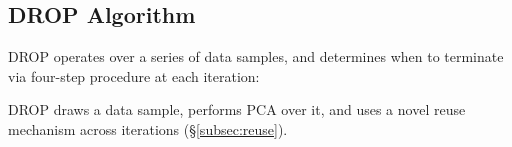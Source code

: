 \subsection{DROP Algorithm}
\label{subsec:arch}
DROP operates over a series of data samples, and determines when to terminate via  four-step procedure at each iteration: %



\begin{comment}
\item Progressive Sampling (\S\ref{subsec:psample}): DROP draws a data sample, performs PCA over it, and uses of a novel reuse mechanism across iterations (\S\ref{subsec:reuse}).

\item Transform Evaluation (\S\ref{subsec:teval}): DROP evaluates the above by identifying the size of the smallest metric-preserving transformation that can be extracted. 

\item Progress Estimation (\S\ref{subsec:pest}): Given the size of the smallest metric-preserving transform and the time required to obtain this transform, DROP estimates the size and computation time of continued iteration.

\item Cost-Based Optimization (\S\ref{subsec:opt}): DROP optimizes over DR and downstream task runtime to determine if it should terminate.
\end{comment}


\noindent DROP draws a data sample, performs PCA over it, and uses a novel reuse mechanism across iterations (\S\ref{subsec:reuse}).


